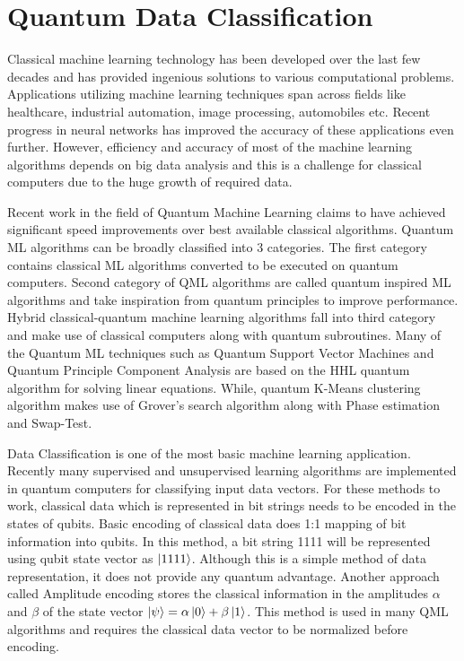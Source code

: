 \documentclass[english,a4paper,11pt,oneside,onecolumn]{book}
\begin{document}
\section{Quantum Data Classification}
\label{sec:qml}
Classical machine learning technology has been developed over the last few decades and has provided ingenious solutions to various computational problems. Applications utilizing machine learning techniques span across fields like healthcare, industrial automation, image processing, automobiles etc. Recent progress in neural networks has improved the accuracy of these applications even further. However, efficiency and accuracy of most of the machine learning algorithms depends on big data analysis and this is a challenge for classical computers due to the huge growth of required data.\par
Recent work in the field of Quantum Machine Learning claims to have achieved significant speed improvements over best available classical algorithms. Quantum ML algorithms can be broadly classified into 3 categories. The first category contains classical ML algorithms converted to be executed on quantum computers. Second category of QML algorithms are called quantum inspired ML algorithms and take inspiration from quantum principles to improve performance. Hybrid classical-quantum machine learning algorithms fall into third category and make use of classical computers along with quantum subroutines. Many of the Quantum ML techniques such as Quantum Support Vector Machines and Quantum Principle Component Analysis are based on the HHL quantum algorithm for solving linear equations. While, quantum K-Means clustering algorithm makes use of Grover's search algorithm along with Phase estimation and Swap-Test.\par
Data Classification is one of the most basic machine learning application. Recently many supervised and unsupervised learning algorithms are implemented in quantum computers for classifying input data vectors. For these methods to work, classical data which is represented in bit strings needs to be encoded in the states of qubits. Basic encoding of classical data does 1:1 mapping of bit information into qubits. In this method, a bit string 1111 will be represented using qubit state vector as \(\ket{1111}\). Although this is a simple method of data representation, it does not provide any quantum advantage. Another approach called Amplitude encoding stores the classical information in the amplitudes $\alpha$ and $\beta$ of the state vector $\ket{\psi} = \alpha\ket{0} + \beta\ket{1}$. This method is used in many QML algorithms and requires the classical data vector to be normalized before encoding.\par
\end{document}
